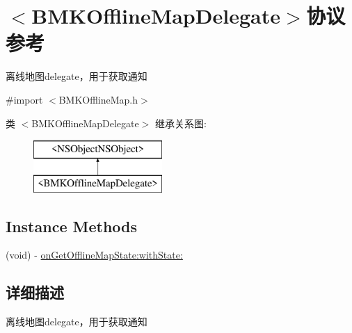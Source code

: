 \hypertarget{protocol_b_m_k_offline_map_delegate-p}{\section{$<$B\+M\+K\+Offline\+Map\+Delegate$>$协议 参考}
\label{protocol_b_m_k_offline_map_delegate-p}
}


离线地图delegate，用于获取通知  




{\ttfamily \#import $<$B\+M\+K\+Offline\+Map.\+h$>$}

类 $<$B\+M\+K\+Offline\+Map\+Delegate$>$ 继承关系图\+:\begin{figure}[H]
\begin{center}
\leavevmode
\includegraphics[height=2.000000cm]{protocol_b_m_k_offline_map_delegate-p}
\end{center}
\end{figure}
\subsection*{Instance Methods}
\begin{DoxyCompactItemize}
\item 
(void) -\/ \hyperlink{protocol_b_m_k_offline_map_delegate-p_abe1dd90ae5ffd9612423c547ab9b1970}{on\+Get\+Offline\+Map\+State\+:with\+State\+:}
\end{DoxyCompactItemize}


\subsection{详细描述}
离线地图delegate，用于获取通知 

